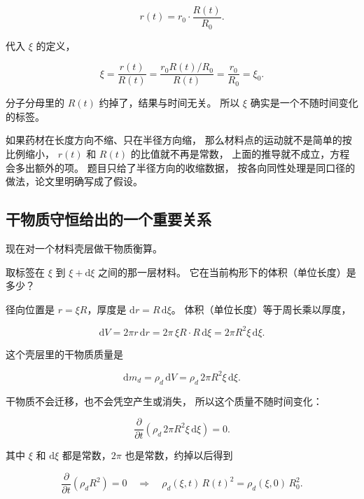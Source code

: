 \begin{equation}
r(t) = r_0\cdot\frac{R(t)}{R_0} .
\end{equation}

代入 $\xi$ 的定义，

\begin{equation}
\xi = \frac{r(t)}{R(t)} = \frac{r_0 R(t)/R_0}{R(t)} = \frac{r_0}{R_0} = \xi_0 .
\end{equation}

分子分母里的 $R(t)$ 约掉了，结果与时间无关。
所以 $\xi$ 确实是一个不随时间变化的标签。

如果药材在长度方向不缩、只在半径方向缩，
那么材料点的运动就不是简单的按比例缩小，
$r(t)$ 和 $R(t)$ 的比值就不再是常数，
上面的推导就不成立，方程会多出额外的项。
题目只给了半径方向的收缩数据，
按各向同性处理是同口径的做法，论文里明确写成了假设。

\subsection{干物质守恒给出的一个重要关系}

现在对一个材料壳层做干物质衡算。

取标签在 $\xi$ 到 $\xi+\mathrm{d}\xi$ 之间的那一层材料。
它在当前构形下的体积（单位长度）是多少？

径向位置是 $r=\xi R$，厚度是 $\mathrm{d}r = R\,\mathrm{d}\xi$。
体积（单位长度）等于周长乘以厚度，

\begin{equation}
\mathrm{d}V = 2\pi r\,\mathrm{d}r = 2\pi\,\xi R\cdot R\,\mathrm{d}\xi
= 2\pi R^2\xi\,\mathrm{d}\xi .
\end{equation}

这个壳层里的干物质质量是

\begin{equation}
\mathrm{d}m_d = \rho_d\,\mathrm{d}V = \rho_d\,2\pi R^2\xi\,\mathrm{d}\xi .
\end{equation}

干物质不会迁移，也不会凭空产生或消失，
所以这个质量不随时间变化：

\begin{equation}
\frac{\partial}{\partial t}\left(\rho_d\,2\pi R^2\xi\,\mathrm{d}\xi\right) = 0 .
\end{equation}

其中 $\xi$ 和 $\mathrm{d}\xi$ 都是常数，$2\pi$ 也是常数，约掉以后得到

\begin{equation}
\frac{\partial}{\partial t}\left(\rho_d R^2\right) = 0
\quad\Longrightarrow\quad
\rho_d(\xi,t)\,R(t)^2 = \rho_d(\xi,0)\,R_0^2 .
\label{eq:rhodinv}
\end{equation}

